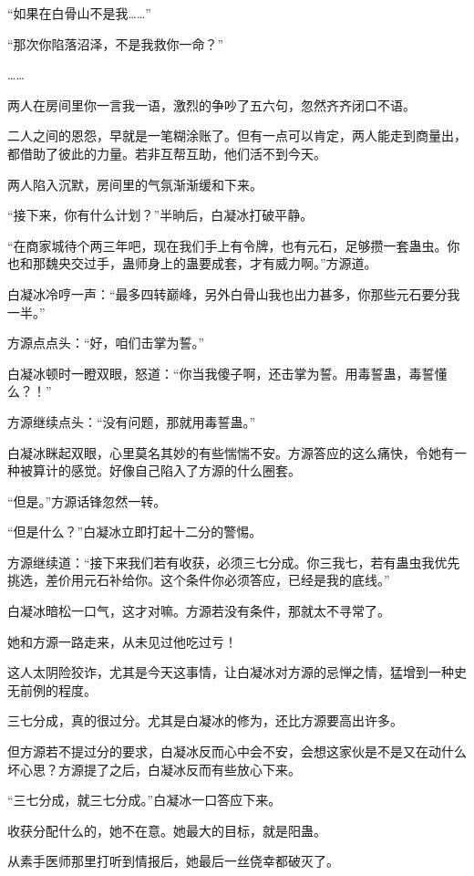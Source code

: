 \begin{this_body}
“如果在白骨山不是我……”

“那次你陷落沼泽，不是我救你一命？”

……

两人在房间里你一言我一语，激烈的争吵了五六句，忽然齐齐闭口不语。

二人之间的恩怨，早就是一笔糊涂账了。但有一点可以肯定，两人能走到商量出，都借助了彼此的力量。若非互帮互助，他们活不到今天。

两人陷入沉默，房间里的气氛渐渐缓和下来。

“接下来，你有什么计划？”半晌后，白凝冰打破平静。

“在商家城待个两三年吧，现在我们手上有令牌，也有元石，足够攒一套蛊虫。你也和那魏央交过手，蛊师身上的蛊要成套，才有威力啊。”方源道。

白凝冰冷哼一声：“最多四转巅峰，另外白骨山我也出力甚多，你那些元石要分我一半。”

方源点点头：“好，咱们击掌为誓。”

白凝冰顿时一瞪双眼，怒道：“你当我傻子啊，还击掌为誓。用毒誓蛊，毒誓懂么？！”

方源继续点头：“没有问题，那就用毒誓蛊。”

白凝冰眯起双眼，心里莫名其妙的有些惴惴不安。方源答应的这么痛快，令她有一种被算计的感觉。好像自己陷入了方源的什么圈套。

“但是。”方源话锋忽然一转。

“但是什么？”白凝冰立即打起十二分的警惕。

方源继续道：“接下来我们若有收获，必须三七分成。你三我七，若有蛊虫我优先挑选，差价用元石补给你。这个条件你必须答应，已经是我的底线。”

白凝冰暗松一口气，这才对嘛。方源若没有条件，那就太不寻常了。

她和方源一路走来，从未见过他吃过亏！

这人太阴险狡诈，尤其是今天这事情，让白凝冰对方源的忌惮之情，猛增到一种史无前例的程度。

三七分成，真的很过分。尤其是白凝冰的修为，还比方源要高出许多。

但方源若不提过分的要求，白凝冰反而心中会不安，会想这家伙是不是又在动什么坏心思？方源提了之后，白凝冰反而有些放心下来。

“三七分成，就三七分成。”白凝冰一口答应下来。

收获分配什么的，她不在意。她最大的目标，就是阳蛊。

从素手医师那里打听到情报后，她最后一丝侥幸都破灭了。


\end{this_body}
